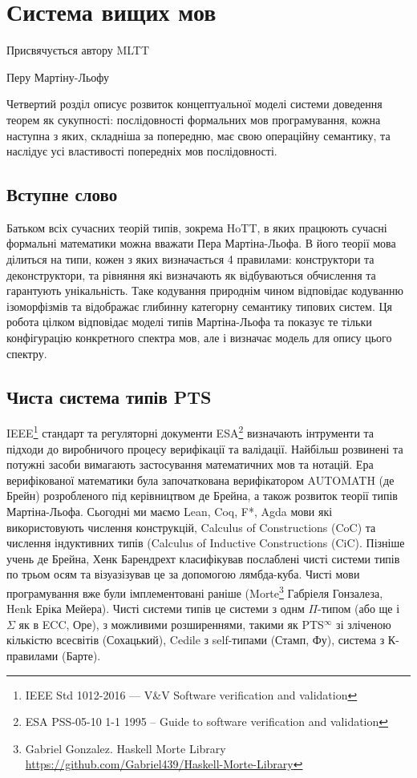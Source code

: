 
\chapter{Система вищих мов}
\epigraph{Присвячується автору MLTT}{Перу Мартіну-Льофу}

Четвертий розділ описує розвиток концептуальної моделі системи доведення теорем як сукупності:
послідовності формальних мов програмування, кожна наступна з яких, складніша за попередню,
має свою операційну семантику, та наслідує усі властивості попередніх мов послідовності.

\section*{Вступне слово}
Батьком всіх сучасних теорій типів, зокрема HoTT, в яких працюють сучасні формальні
математики можна вважати Пера Мартіна-Льофа. В його теорії мова ділиться на типи,
кожен з яких визначається 4 правилами: конструктори та деконструктори,
та рівняння які визначають як відбуваються обчислення та гарантують унікальність.
Таке кодування природнім чином відповідає кодуванню ізоморфізмів та відображає
глибинну категорну семантику типових систем. Ця робота цілком відповідає
моделі типів Мартіна-Льофа та показує те тільки конфігурацію конкретного спектра мов,
але і визначає модель для опису цього спектру.

\section{Чиста система типів PTS}
IEEE\footnote{IEEE Std 1012-2016  --- V\&V Software verification and validation} стандарт
та регуляторні документи ESA\footnote{ESA PSS-05-10 1-1 1995 -- Guide to software verification and validation}
визначають інтрументи та підходи до виробничого процесу верифікації та валідації.
Найбільш розвинені та потужні засоби вимагають застосування математичних мов та нотацій.
Ера верифікованої математики була започаткована верифікатором AUTOMATH\cite{deBruijn83} (де Брейн) розробленого
під керівництвом де Брейна, а також розвиток теорії типів Мартіна-Льофа\cite{Lof84}.
Сьогодні ми маємо Lean, Coq, F*, Agda мови які використовують числення
конструкцій, Calculus of Constructions\cite{Coq88} (CoC)
та числення індуктивних типів (Calculus of Inductive Constructions\cite{Pfenning89} (CiC).
Пізніше учень де Брейна, Хенк Барендрехт класифікував послаблені чисті
системи типів по трьом осям та візуазізував це за допомогою лямбда-куба\cite{Henk93}.
Чисті мови програмування вже були імплементовані раніше
(Morte\footnote{Gabriel Gonzalez. Haskell Morte Library \url{https://github.com/Gabriel439/Haskell-Morte-Library}} Габріеля Гонзалеза, Henk\cite{Erik97} Еріка Мейера).
Чисті системи типів це системи з однм $\Pi$-типом (або ще і $\Sigma$ як в ECC\cite{Ore92}, Оре),
з можливими розширеннями, такими як PTS$^\infty$ зі зліченою кількістю всесвітів\cite{Tonpa18} (Сохацький),
Cedile з self-типами\cite{Fu14}\cite{Stump17} (Стамп, Фу), система з К-правилами\cite{Barthe95} (Барте).

